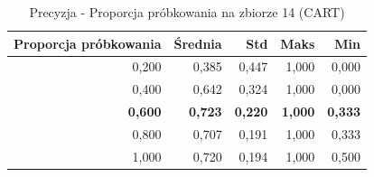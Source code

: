 \begin{table}[htbp]
\centering
\small
\setlength{\tabcolsep}{6pt}
\renewcommand{\arraystretch}{1.2}
\caption{Precyzja - Proporcja próbkowania na zbiorze 14 (CART)}
\label{tab:CART_sample_ratio_14_precision}
\begin{tabular}{r|r|r|r|r}
\toprule
Proporcja próbkowania & Średnia & Std & Maks & Min \\
\hline
0,200 & 0,385 & 0,447 & 1,000 & 0,000 \\
0,400 & 0,642 & 0,324 & 1,000 & 0,000 \\
\textbf{0,600} & \textbf{0,723} & \textbf{0,220} & \textbf{1,000} & \textbf{0,333} \\
0,800 & 0,707 & 0,191 & 1,000 & 0,333 \\
1,000 & 0,720 & 0,194 & 1,000 & 0,500 \\
\bottomrule
\end{tabular}
\end{table}